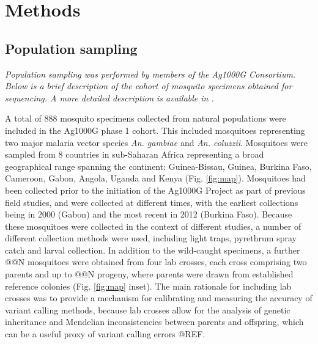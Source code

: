 \documentclass[a4paper,11pt,abstracton,hidelinks]{scrartcl}
\begin{document}
\section{Methods}


\subsection{Population sampling}


\textit{Population sampling was performed by members of the Ag1000G Consortium. Below is a brief description of the cohort of mosquito specimens obtained for sequencing. A more detailed description is available in \citet{Ag1000G2017}.}


A total of 888 mosquito specimens collected from natural populations were included in the Ag1000G phase 1 cohort. 
%
This included mosquitoes representing two major malaria vector species  \textit{An. gambiae} and \textit{An. coluzzii}.
%
Mosquitoes were sampled from 8 countries in sub-Saharan Africa representing a broad geographical range spanning the continent: Guinea-Bissau, Guinea, Burkina Faso, Cameroon, Gabon, Angola, Uganda and Kenya (Fig. \ref{fig:map}).
%
Mosquitoes had been collected prior to the initiation of the Ag1000G Project as part of previous field studies, and were collected at different times, with the earliest collections being in 2000 (Gabon) and the most recent in 2012 (Burkina Faso).
%
Because these mosquitoes were collected in the context of different studies, a number of different collection methods were used, including light traps, pyrethrum spray catch and larval collection.
%
In addition to the wild-caught specimens, a further @@N mosquitoes were obtained from four lab crosses, each cross comprising two parents and up to @@N progeny, where parents were drawn from established reference colonies (Fig. \ref{fig:map} inset).
%
The main rationale for including lab crosses was to provide a mechanism for calibrating and measuring the accuracy of variant calling methods, because lab crosses allow for the analysis of genetic inheritance and Mendelian inconsistencies between parents and offspring, which can be a useful proxy of variant calling errors @REF.
\end{document}
